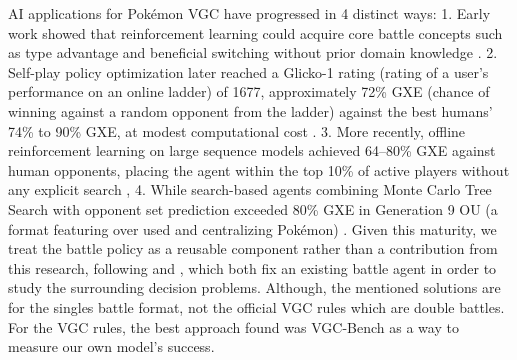 \documentclass[conference]{IEEEtran}
\begin{document}
AI applications for Pokémon VGC have progressed in 4 distinct ways: 1. Early work showed that reinforcement learning could acquire core battle concepts such as type advantage and beneficial switching without prior domain knowledge \cite{simoes2020}. 2. Self-play policy optimization later reached a Glicko-1 rating (rating of a user's performance on an online ladder) of 1677, approximately 72\% GXE (chance of winning against a random opponent from the ladder) against the best humans' 74\% to 90\% GXE\cite{grigsby2025}, at modest computational cost \cite{huang2019}. 3. More recently, offline reinforcement learning on large sequence models achieved 64–80\% GXE against human opponents, placing the agent within the top 10\%  of active players without any explicit search \cite{grigsby2025}, 4. While search-based agents combining Monte Carlo Tree Search with opponent set prediction exceeded 80\% GXE in Generation 9 OU (a format featuring over used and centralizing Pokémon) \cite{karten2026}. Given this maturity, we treat the battle policy as a reusable component rather than a contribution from this research, following \cite{reis2024} and \cite{reis2025}, which both fix an existing battle agent in order to study the surrounding decision problems. Although, the mentioned solutions are for the singles battle format, not the official VGC rules which are double battles. For the VGC rules, the best approach found was VGC-Bench as a way to measure our own model's success. \\
\end{document}
